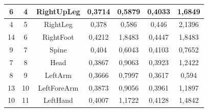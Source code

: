 \begin{table}[ht!]
{\begin{tabular}{|c|c|c|c|c|c|c|}
6        & 4         & RightUpLeg         & 0,3714                                                       & 0,5879                                                       & 0,4033                                                                  & 1,6849                                                                  \\ \hline
4        & 5         & RightLeg           & 0,378                                                        & 0,586                                                        & 0,446                                                                   & 2,1396                                                                  \\ \hline
14       & 6         & RightFoot          & 0,4212                                                       & 1,8483                                                       & 0,4447                                                                  & 1,8483                                                                  \\ \hline
9        & 7         & Spine              & 0,404                                                        & 0,6043                                                       & 0,4103                                                                  & 0,7652                                                                  \\ \hline
7        & 8         & Head               & 0,3867                                                       & 0,9063                                                       & 0,3923                                                                  & 1,2422                                                                  \\ \hline
8        & 9         & LeftArm            & 0,3666                                                       & 0,7997                                                       & 0,3617                                                                  & 0,594                                                                   \\ \hline
13       & 10        & LeftForeArm        & 0,3873                                                       & 0,9056                                                       & 0,3961                                                                  & 1,1897                                                                  \\ \hline
10       & 11        & LeftHand           & 0,4007                                                       & 1,1722                                                       & 0,4128                                                                  & 1,4842                                                                  \\ \hline

\end{tabular}}
\end{table}

